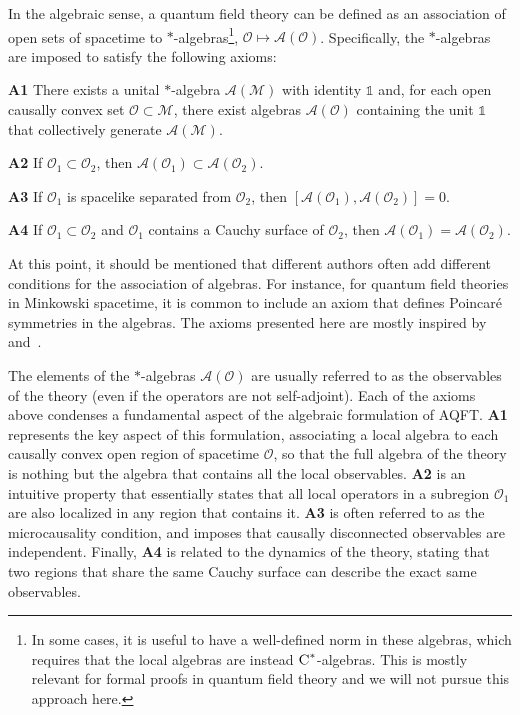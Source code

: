 \documentclass[letterpaper,12pt,titlepage,oneside,final]{book}
\newcommand{\openone}{\mathds{1}}
\newcommand{\M}{\mathcal{M}}
\newcommand{\tc}[1]{\textsc{#1}}
\begin{document}
In the algebraic sense, a quantum field theory can be defined as an association of open sets of spacetime to $\ast$-algebras\footnote{In some cases, it is useful to have a well-defined norm in these algebras, which requires that the local algebras are instead $\tc{C}^*$-algebras. This is mostly relevant for formal proofs in quantum field theory and we will not pursue this approach here.}, $\mathcal{O}\longmapsto \mathcal{A}(\mathcal{O})$. Specifically, the $\ast$-algebras are imposed to satisfy the following axioms:

\noindent\textbf{A1} There exists a unital $\ast$-algebra $\mathcal{A}(\M)$ with identity $\openone$ and, for each open causally convex set $\mathcal{O}\subset \M$, there exist algebras $\mathcal{A}(\mathcal{O})$ containing the unit $\openone$ that collectively generate $\mathcal{A}(\M)$.

\noindent\textbf{A2} If $\mathcal{O}_1\subset \mathcal{O}_2$, then $\mathcal{A}(\mathcal{O}_1)\subset \mathcal{A}(\mathcal{O}_2)$.

\noindent\textbf{A3} If $\mathcal{O}_1$ is spacelike separated from $\mathcal{O}_2$, then $[\mathcal{A}(\mathcal{O}_1),\mathcal{A}(\mathcal{O}_2)] = 0$.

\noindent\textbf{A4} If $\mathcal{O}_1\subset \mathcal{O}_2$ and $\mathcal{O}_1$ contains a Cauchy surface of $\mathcal{O}_2$, then $\mathcal{A}(\mathcal{O}_1) = \mathcal{A}(\mathcal{O}_2)$.

\noindent At this point, it should be mentioned that different authors often add different conditions for the association of algebras. For instance, for quantum field theories in Minkowski spacetime, it is common to include an axiom that defines Poincar\'e symmetries in the algebras. The axioms presented here are mostly inspired by~\cite{kasiaFewsterIntro} and~\cite{TheBookGoodChap}.

The elements of the $\ast$-algebras $\mathcal{A}(\mathcal{O})$ are usually referred to as the observables of the theory (even if the operators are not self-adjoint). Each of the axioms above condenses a fundamental aspect of the algebraic formulation of AQFT. \textbf{A1} represents the key aspect of this formulation, associating a local algebra to each causally convex open region of spacetime $\mathcal{O}$, so that the full algebra of the theory is nothing but the algebra that contains all the local observables. \textbf{A2} is an intuitive property that essentially states that all local operators in a subregion $\mathcal{O}_1$ are also localized in any region that contains it. \textbf{A3} is often referred to as the microcausality condition, and imposes that causally disconnected observables are independent. Finally, \textbf{A4} is related to the dynamics of the theory, stating that two regions that share the same Cauchy surface can describe the exact same observables. 
\end{document}
